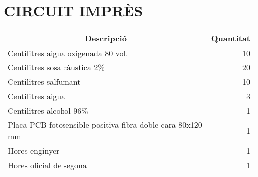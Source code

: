 \chapter{\uppercase{Circuit imprès}}

\begin{table}[H]
  \begin{center}
    \begin{tabularx} {\textwidth} {|X|r|} \hline
  \multicolumn{1}{|c|}{Descripció} &  \multicolumn{1}{c|}{Quantitat}\\ \hline \hline
    Centilitres aigua oxigenada 80 vol. & 10 \\ \hline
    Centilitres sosa càustica 2\% & 20 \\ \hline
    Centilitres salfumant & 10 \\ \hline
    Centilitres aigua & 3 \\ \hline
    Centilitres alcohol 96\% & 1 \\ \hline
    Placa PCB fotosensible positiva fibra doble cara 80x120 mm  & 1 \\ \hline
            Hores enginyer & 1 \\ \hline
    Hores oficial de segona & 1 \\ \hline
    \end{tabularx}%
  \end{center}

  \label{tab:addlabel}%
\end{table}%

